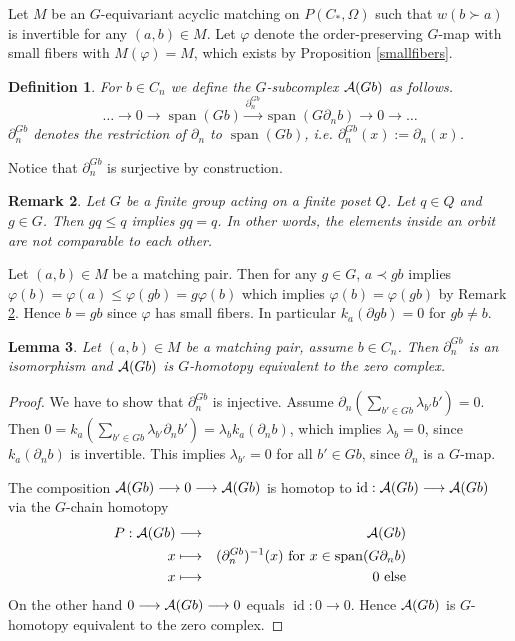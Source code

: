 \documentclass{elsarticle}
\newtheorem{df}{Definition}[section]
\newtheorem{lem}[df]{Lemma}
\newtheorem{rem}[df]{Remark}
\def\id{\operatorname{id}}
\def\span{\operatorname{span}}
\begin{document}
Let $M$ be an $G$-equivariant acyclic matching on $P(C_*,\Omega)$ such that $w(b\succ a)$ is invertible for any $(a,b)\in M$. Let $\varphi$ denote the order-preserving $G$-map with small fibers with $M(\varphi)=M$, which exists by Proposition \ref{smallfibers}.
\begin{df}
For $b\in C_n$ we define the $G$-subcomplex ${\cal A}(Gb)$ as follows.
\[\dots\longrightarrow 0\longrightarrow\span(Gb)\overset{\partial^{Gb}_n}\longrightarrow\span(G\partial_n b)\longrightarrow 0\longrightarrow\dots\]
$\partial^{Gb}_n$ denotes the restriction of $\partial_n$ to $\span(Gb)$, i.e. $\partial^{Gb}_n(x):=\partial_n(x)$.
\end{df}
Notice that $\partial^{Gb}_n$ is surjective by construction.
\begin{rem}
\label{poset_orbit}
Let $G$ be a finite group acting on a finite poset $Q$. Let $q\in Q$ and $g\in G$. Then $gq\leq q$ implies $gq=q$. In other words, the elements inside an orbit are not comparable to each other.
\end{rem}
Let $(a,b)\in M$ be a matching pair. Then for any $g\in G$, $a\prec gb$ implies $\varphi(b)=\varphi(a)\leq\varphi(gb)=g\varphi(b)$ which implies $\varphi(b)=\varphi(gb)$ by Remark \ref{poset_orbit}. Hence $b=gb$ since $\varphi$ has small fibers. In particular $k_a(\partial gb)=0$ for $gb\not=b$.
\begin{lem}
\label{iso}
Let $(a,b)\in M$ be a matching pair, assume $b\in C_n$. Then $\partial^{Gb}_n$ is an isomorphism and ${\cal A}(Gb)$ is $G$-homotopy equivalent to the zero complex.
\end{lem}
\begin{proof}
We have to show that $\partial^{Gb}_n$ is injective. Assume $\partial_n(\sum_{b'\in Gb}\lambda_{b'}b')=0$. Then $0=k_a(\sum_{b'\in Gb}\lambda_{b'}\partial_nb')=\lambda_{b}k_a(\partial_nb)$, which implies $\lambda_b=0$, since $k_a(\partial_nb)$ is invertible. This implies $\lambda_{b'}=0$ for all $b'\in Gb$, since $\partial_n$ is a $G$-map.

The composition ${\cal A}(Gb)\longrightarrow0\longrightarrow{\cal A}(Gb)$ is homotop to $\id:{\cal A}(Gb)\longrightarrow{\cal A}(Gb)$ via the $G$-chain homotopy
\begin{eqnarray*}
P:{\cal A}(Gb)&\longrightarrow&{\cal A}(Gb)\\
x&\longmapsto&(\partial^{Gb}_n)^{-1}(x)\text{ for $x\in\span(G\partial_n b)$}\\
x&\longmapsto&0\text{ else}
\end{eqnarray*}
On the other hand $0\longrightarrow{\cal A}(Gb)\longrightarrow 0$ equals $\id:0\longrightarrow 0$. Hence ${\cal A}(Gb)$ is $G$-homotopy equivalent to the zero complex.
\end{proof}
\end{document}
